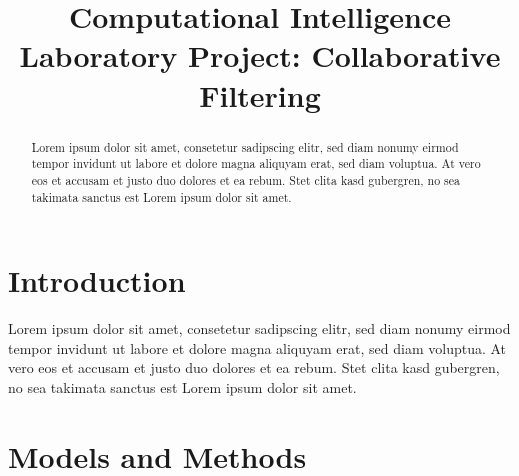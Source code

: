 \documentclass[10pt,conference,compsocconf]{IEEEtran}
\begin{document}
\title{Computational Intelligence Laboratory Project: Collaborative Filtering}

\author{

}
\maketitle

\begin{abstract}


  Lorem ipsum dolor sit amet, consetetur sadipscing elitr, sed diam nonumy
  eirmod tempor invidunt ut labore et dolore magna aliquyam erat, sed diam
  voluptua. At vero eos et accusam et justo duo dolores et ea rebum. Stet clita
  kasd gubergren, no sea takimata sanctus est Lorem ipsum dolor sit
  amet.\cite{funk2006netflix}
\end{abstract}

\section{Introduction}
\label{sec:introduction}

Lorem ipsum dolor sit amet, consetetur sadipscing elitr, sed diam nonumy eirmod
tempor invidunt ut labore et dolore magna aliquyam erat, sed diam voluptua. At
vero eos et accusam et justo duo dolores et ea rebum. Stet clita kasd gubergren,
no sea takimata sanctus est Lorem ipsum dolor sit amet.

\section{Models and Methods}
\label{sec:models_and_methods}
\end{document}
